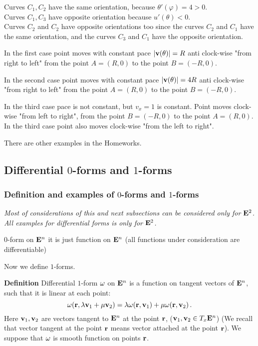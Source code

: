 \documentclass[12pt]{article}
\numberwithin{equation}{section}
\begin{document}
Curves $C_1,C_2$ have the same orientation, because $\theta'(\varphi)=4>0$.\\
Curves $C_1, C_3$ have opposite orientation because $u'(\theta)<0$.\\
Curves $C_2$ and $C_2$ have opposite orientations too since
the curves $C_2$ and $C_1$ have the same orientation, and
the curves $C_3$ and $C_1$ have the opposite orientation.



In the first case point moves with constant pace $|{\bf v}(\theta)|=R$
anti clock-wise "from right to left" from the  point $A=(R,0)$ 
to the point $B=(-R,0)$.

In the second case point moves with constant pace $|{\bf v}(\theta)|=4R$
anti clock-wise "from right to left" from the  point $A=(R,0)$ 
to the point $B=(-R,0)$.



In the third case pace is not constant, but $v_x=1$ is constant.
Point moves clock-wise "from left to right", from the  point $B=(-R,0)$ 
to the point $A=(R,0)$.
In the third case  point also moves clock-wise "from the left to right".

There are other examples in the Homeworks.


\subsection {Differential $0$-forms and $1$-forms}

\subsubsection {Definition and examples of $0$-forms and $1$-forms }


{\it Most of considerations of this and next subsections  
can be considered
only for ${\bf E}^2$.
All examples  for differential forms
is only for ${\bf E}^2$.}

\bigskip


$0$-form on ${\bf E}^n$ it is just function on ${\bf E}^n$ (all functions under consideration are differentiable)


\bigskip

 Now we define $1$-forms.

{\bf Definition} Differential $1$-form ${\omega}$ on ${\bf E}^n$ is a function  on tangent vectors
of ${\bf E}^n$, such that it is linear at each point:
\begin{equation}\label{linearityof1forms}
    {\omega}({\bf r}, \lambda {\bf v}_1+\mu{\bf v}_2)=\lambda {\omega}({\bf r},{\bf v}_1)+\mu {\omega}({\bf r},{\bf v}_2)\,.
\end{equation}
Here ${\bf v}_1,{\bf v}_2$ are vectors tangent to ${\bf E}^n$ at the point ${\bf r}$, (${\bf v}_1,{\bf v}_2\in T_x{\bf E}^n$)
(We recall that vector tangent at the point ${\bf r}$ means vector attached at the point ${\bf r}$).
We suppose that ${\omega}$ is smooth function on points ${\bf r}$.
            
\end{document}
